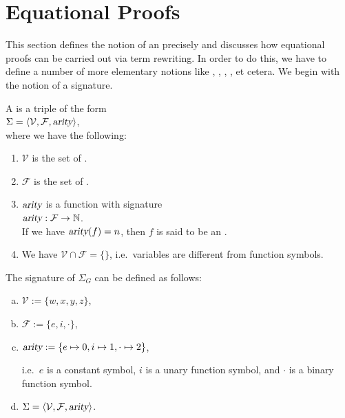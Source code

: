\section{Equational Proofs}
This section defines the notion of an  precisely and discusses how equational proofs can
be carried out via term rewriting.  In order to do this, we have to define a number of more elementary notions
like , , , , et cetera.  We begin with
the notion of a signature.

\begin{Definition}[Signature]
  A  is a triple of the form
  \\[0.2cm]
  \hspace*{1.3cm} $\Sigma = \langle \mathcal{V}, \mathcal{F}, \textsl{arity} \rangle$,
  \\[0.2cm]
  where we have the following: 
  \begin{enumerate}
  \item $\mathcal{V}$ is the set of . 
  \item $\mathcal{F}$ is the set of . 
  \item $\textsl{arity}$ is a function with signature
        \\[0.2cm]
        \hspace*{1.3cm}
        $\textsl{arity}: \mathcal{F} \rightarrow \mathbb{N}$.
        \\[0.2cm]
        If we have $\textsl{arity}(f) = n$, then $f$ is said to be an .
  \item We have $\mathcal{V} \cap \mathcal{F} = \{\}$, i.e.~variables are different from function symbols. \eoxs
  \end{enumerate}
\end{Definition}

\example
The signature of  $\Sigma_G$ can be defined as follows:
\begin{enumerate}[(a)]
\item $\mathcal{V} := \{ w, x, y, z \}$,
\item $\mathcal{F} := \{ e, i, \cdot \}$,
\item $\textsl{arity} := \{ e \mapsto 0, i \mapsto 1, \cdot \mapsto 2 \}$,
  
      i.e.~$e$ is a constant symbol, $i$ is a unary function symbol, and $\cdot$ is a binary function symbol.
\item $\Sigma = \langle \mathcal{V}, \mathcal{F}, \textsl{arity} \rangle$. \eoxs
\end{enumerate}

